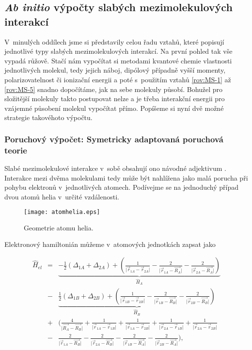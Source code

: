\subsection{\textit{Ab initio} výpočty slabých mezimolekulových interakcí}

V~minulých oddílech jsme si představily celou řadu vztahů, které popisují jednotlivé typy slabých mezimolekulových interakcí. Na první pohled tak vše vypadá růžově. Stačí nám vypočítat si metodami kvantové chemie vlastnosti jednotlivých molekul, tedy jejich náboj, dipólový případně vyšší momenty, polarizovatelnost či ionizační energii a poté s~použitím vztahů \eqref{rov:MS-1} až \eqref{rov:MS-5} snadno dopočítáme, jak na sebe molekuly působí. Bohužel pro složitější molekuly takto postupovat nelze a je třeba interakční energii pro vzájemné působení molekul vypočítat přímo. Popíšeme si nyní dvě možné strategie takovéhoto výpočtu.


\subsubsection{Poruchový výpočet: Symetricky adaptovaná poruchová teorie}

Slabé mezimolekulové interakce v~sobě obsahují ono návodné adjektivum . Interakce mezi dvěma molekulami tedy může být nahlížena jako malá porucha při pohybu elektronů v~jednotlivých atomech. Podívejme se na jednoduchý případ dvou atomů helia v~určité vzdálenosti.


\begin{figure} [htb]
\centering
\texttt{[image: atomhelia.eps]}
\caption{Geometrie atomu helia.}
\label{obr:AtomHelia}
\end{figure}


Elektronový hamiltonián můžeme v~atomových jednotkách zapsat jako


\begin{eqnarray}
\hat{H}_{el} &=&  \underbrace{- \frac{1}{2} (\Delta_{1A} + \Delta_{2A}) + \left( \frac{1}{\vert \vec{r}_{1A} - \vec{r}_{2A} \vert} - \frac{2}{\vert \vec{r}_{1A} - \vec{R_A}\vert} - \frac{2}{\vert \vec{r}_{2A} - \vec{R_A} \vert} \right)}_{\hat{H}_A} \nonumber \\
&-& \underbrace{\frac{1}{2} (\Delta_{1B} + \Delta_{2B}) + \left( \frac{1}{\vert \vec{r}_{1B} - \vec{r}_{2B} \vert} - \frac{2}{\vert \vec{r}_{1B} - \vec{R_B}\vert} - \frac{2}{\vert \vec{r}_{2B} - \vec{R_B} \vert} \right)}_{\hat{H}_B} \nonumber \\
&+&  \bigg( \frac{4}{\vert \vec{R_A} - \vec{R_B}\vert} + \frac{1}{\vert \vec{r}_{1A} - \vec{r}_{1B} \vert} + \frac{1}{\vert \vec{r}_{1A} - \vec{r}_{2B}\vert} + \frac{1}{\vert \vec{r}_{2A} - \vec{r}_{1B} \vert} + \frac{1}{\vert \vec{r}_{2A} - \vec{r}_{2B} \vert} \nonumber \\
&-&  \frac{2}{\vert \vec{r}_{1A} - \vec{R_B} \vert} - \frac{2}{\vert \vec{r}_{2A} - \vec{R_B} \vert} - \frac{2}{\vert \vec{r}_{1B} - \vec{R_A} \vert} - \frac{2}{\vert \vec{r}_{2B} - \vec{R_A} \vert} \bigg),
\label{rov:MS-6}
\end{eqnarray}

